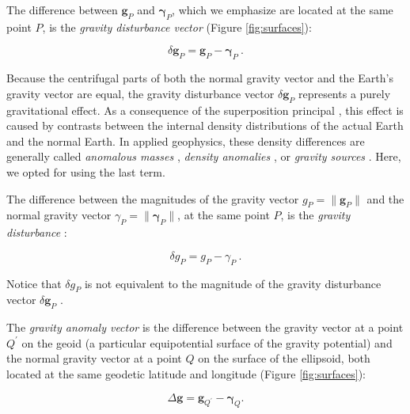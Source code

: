 \documentclass[paper,twocolumn,twoside]{geophysics}
\begin{document}
The difference between $\mathbf{g}_{P}$ and $\boldsymbol{\gamma}_{P}$,
which we emphasize are located at the same point $P$,
is the \textit{gravity disturbance vector} (Figure \ref{fig:surfaces}):

\begin{equation}
\delta \mathbf{g}_{P} =
\mathbf{g}_{P} - \boldsymbol{\gamma}_{P} \: .
\label{eq:gravity-disturbance-vector}
\end{equation}

Because the centrifugal parts of both the normal gravity vector
and the Earth's gravity vector are equal,
the gravity disturbance vector $\delta \mathbf{g}_{P}$
represents a purely gravitational effect.
As a consequence of the superposition principal \citep{blakely1996},
this effect is caused by contrasts between
the internal density distributions
of the actual Earth and the normal Earth.
In applied geophysics, these density differences are generally called
\textit{anomalous masses} \citep[e.g.,][]{hammer1945,lafehr1965},
\textit{density anomalies} \citep[e.g.,][]{forsberg1984},
or \textit{gravity sources} \citep[e.g.,][]{blakely1996}.
Here, we opted for using the last term.

The difference between the magnitudes of the gravity vector
$g_{P} = \| \mathbf{g}_{P} \|$ and the normal gravity vector
$\gamma_{P} = \| \boldsymbol{\gamma}_{P} \|$,
at the same point $P$, is the \textit{gravity disturbance}
\citep{heiskanen-moritz1967, hofmann-wellenhof-moritz2005}:

\begin{equation}
\delta g_{P} = g_{P} - \gamma_{P} \: .
\label{eq:gravity-disturbance}
\end{equation}

\noindent
Notice that $\delta g_{P}$ is not equivalent
to the magnitude of the gravity disturbance vector
$\delta \mathbf{g}_{P}$ \citep{barthelmes2013, sanso_sideris2013}.

The \textit{gravity anomaly vector}
is the difference between the gravity
vector at a point $Q^{\prime}$ on the geoid
(a particular equipotential surface of the gravity potential)
and the normal gravity vector at a point $Q$ on the surface of the ellipsoid,
both located at the same geodetic latitude and longitude
(Figure \ref{fig:surfaces}):

\begin{equation}
\Delta \mathbf{g} = \mathbf{g}_{Q^{\prime}} - \boldsymbol{\gamma}_{Q} .
\label{eq:gravity-anomaly-vector}
\end{equation}
\end{document}
